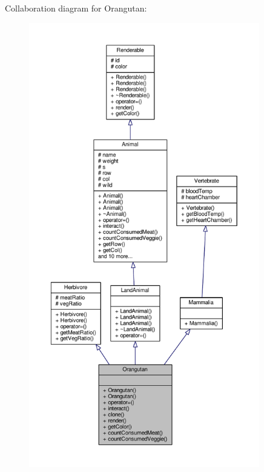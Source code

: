 Collaboration diagram for Orangutan\+:
\nopagebreak
\begin{figure}[H]
\begin{center}
\leavevmode
\includegraphics[height=550pt]{classOrangutan__coll__graph}
\end{center}
\end{figure}
